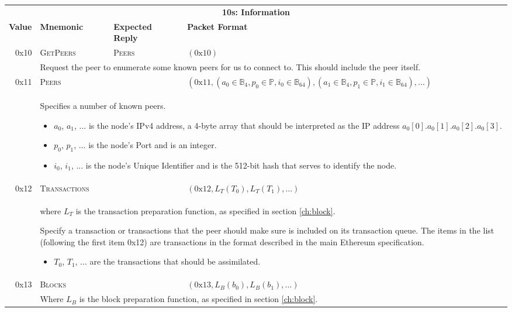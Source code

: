 \documentclass[9pt,oneside]{amsart}
\begin{document}
\begin{tabular*}{\columnwidth}[h]{rlll}
\toprule
\multicolumn{4}{c}{\textbf{10s: Information}} \vspace{5pt} \\
\textbf{Value} & \textbf{Mnemonic} & \textbf{Expected Reply} & \textbf{Packet Format} \vspace{5pt} \\
0x10 & \textsc{GetPeers} & \textsc{Peers} & $(\text{0x}10)$ \\
& \multicolumn{3}{p{0.8\columnwidth}}{Request the peer to enumerate some known peers for us to connect to. This should include the peer itself.}\\
\midrule
0x11 & \textsc{Peers} & & $(\text{0x}11, (a_0 \in \mathbb{B}_4, p_0 \in \mathbb{P}, i_0 \in \mathbb{B}_{64}), (a_1 \in \mathbb{B}_4, p_1 \in \mathbb{P}, i_1 \in \mathbb{B}_{64}), ...)$ \\
& \multicolumn{3}{p{0.8\columnwidth}}{
Specifies a number of known peers. 
\begin{itemize}
\item $a_0$, $a_1$, ... is the node's IPv4 address, a 4-byte array that should be interpreted as the IP address $a_0[0]$.$a_0[1]$.$a_0[2]$.$a_0[3]$.
\item $p_0$, $p_1$, ... is the node's Port and is an integer.
\item $i_0$, $i_1$, ... is the node's Unique Identifier and is the 512-bit hash that serves to identify the node.
\end{itemize}
}\\
\midrule
0x12 & \textsc{Transactions} & & $(\text{0x}12, L_T(T_0), L_T(T_1), ...)$ \\
& \multicolumn{3}{p{0.8\columnwidth}}{
where $L_T$ is the transaction preparation function, as specified in section \ref{ch:block}.

Specify a transaction or transactions that the peer should make sure is included on its transaction queue. The items in the list (following the first item 0x12) are transactions in the format described in the main Ethereum specification.
\begin{itemize}
\item $T_0$, $T_1$, ... are the transactions that should be assimilated.
\end{itemize}
}\\
\midrule
0x13 & \textsc{Blocks} && $(\text{0x}13, L_B(b_0), L_B(b_1), ...)$ \\
& \multicolumn{3}{p{0.8\columnwidth}}{
Where $L_B$ is the block preparation function, as specified in section \ref{ch:block}.

}
\end{tabular*}
\end{document}

